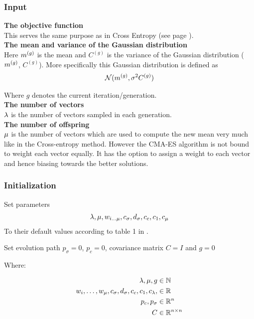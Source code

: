 \subsubsection{Input}

\textbf{The objective function} \\
This serves the same purpose as in Cross Entropy (see page \pageref{CEObjective}).
\\

\textbf{The mean and variance of the Gaussian distribution} \\
Here $m^{(g)}$ is the mean and  
${C^{(g)}}$ is the variance 
of the Gaussian distribution ($m^{(g)}$,
${C^{(g)}}$). 
More specifically this Gaussian distribution is defined as 
\begin{align}
\mathcal{N}(m^{(g)},\sigma^2 C^{(g)})
\end{align}

Where $g$ denotes the current iteration/generation.\\


\textbf{The number of vectors}\\
$\lambda$ is the number of vectors sampled in each generation.
\\

\textbf{The number of offspring}\\
$\mu$ is the number of vectors which are used to compute 
the new mean very much like in the Cross-entropy method. However the CMA-ES algorithm
is not bound to weight each vector equally. It has the option to assign 
a weight to each vector and hence biasing towards the better solutions.
\\


\subsubsection{Initialization}


Set parameters
\begin{align}
\lambda, \mu, w_{i \dots \mu}, c_{\sigma}, d_{\sigma}, c_c, c_1, c_{\mu}
\end{align}
To their default values according to table 1 in \citep{hansen2011}.

Set evolution path $p_{\sigma} = 0$, $p_{c} = 0$, covariance matrix $C = I$ and $g = 0$

Where:

\begin{align}
\lambda, \mu, g &\in \mathbb{N}\\
w_i,\dots,w_{\mu}, c_{\sigma}, d_{\sigma}, c_c, c_1, c_{\lambda}, &\in \mathbb{R}\\
p_{c}, p_{\sigma} &\in \mathbb{R}^{n}\\
C &\in \mathbb{R}^{n \times n}
\end{align}

